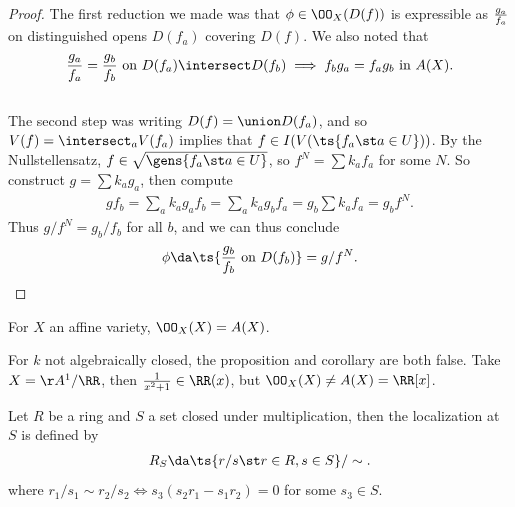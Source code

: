 \begin{proof}

The first reduction we made was that \(\phi \in \OO_X(D(f))\) is
expressible as \(g_a\over f_a\) on distinguished opens \(D(f_a)\)
covering \(D(f)\). We also noted that
\begin{align*}
{g_a \over f_a} = {g_b \over f_b} \text{ on } D(f_a) \intersect D(f_b) \implies f_b g_a = f_a g_b \text{ in } A(X)
.\end{align*}\\

The second step was writing \(D(f) = \union D(f_a)\), and so
\(V(f) = \intersect_a V(f_a)\) implies that
\(f\in I(V(\ts{f_a \st a\in U}))\). By the Nullstellensatz,
\(f\in \sqrt{\gens{f_a \st a\in U}}\), so \(f^N = \sum k_a f_a\) for
some \(N\). So construct \(g = \sum k_a g_a\), then compute
\begin{align*}  
gf_b = \sum_a k_a g_a f_b = \sum_a k_a g_b f_a = g_b \sum k_a f_a = g_b f^N
.\end{align*} Thus \(g/f^N = g_b / f_b\) for all \(b\), and we can thus
conclude
\begin{align*}  
\phi \da \ts{{g_b \over f_b} \text{ on } D(f_b)} = g/f^N
.\end{align*}

\end{proof}

\begin{corollary}[?]

For \(X\) an affine variety, \(\OO_X(X) = A(X)\).

\end{corollary}

\begin{warnings}

For \(k\) not algebraically closed, the proposition and corollary are
both false. Take \(X = \AA^1/\RR\), then \({1\over x^2+1} \in \RR(x)\),
but \(\OO_X(X) \neq A(X) = \RR[x]\).

\end{warnings}

\begin{definition}[Localization]

Let \(R\) be a ring and \(S\) a set closed under multiplication, then
the localization at \(S\) is defined by
\begin{align*}  
R_S \da \ts{r/s \st r\in R, s\in S} / \sim
.\end{align*} where
\(r_1/s_1 \sim r_2/s_2 \iff s_3(s_2 r_1 - s_1 r_2) = 0\) for some
\(s_3 \in S\).

\end{definition}

